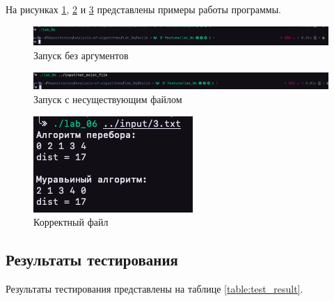 \documentclass[a4paper,12pt]{article}
\begin{document}
На рисунках \ref{img:zero_arg}, \ref{img:not_exist} и \ref{img:good} представлены примеры работы программы.

\begin{figure}[H]
    \centering
    \includegraphics[scale=0.4]{zero_arg}
    \caption{Запуск без аргументов}
    \label{img:zero_arg}
\end{figure}

\begin{figure}[H]
    \centering
    \includegraphics[scale=0.4]{not_exist}
    \caption{Запуск с несуществующим файлом}
    \label{img:not_exist}
\end{figure}

\begin{figure}[H]
    \centering
    \includegraphics[scale=1]{good}
    \caption{Корректный файл}
    \label{img:good}
\end{figure}

\subsection{Результаты тестирования}

Результаты тестирования представлены на таблице \ref{table:test_result}.
\end{document}
